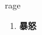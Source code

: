 
\begin{frame}
{\huge rage}
\begin{center}
\begin{enumerate}\Large
  \item \textbf{暴怒}
\end{enumerate}
\end{center}
\end{frame}
